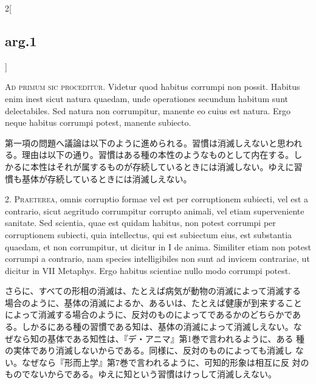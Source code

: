 \documentclass[paper=a4paper,fontsize=10pt,jafontsize=9pt,titlepage]{jlreq}
\begin{document}
\begin{paracol}{2}[\subsection{arg.1}]

{\scshape Ad primum sic proceditur}. Videtur quod habitus corrumpi non
possit. Habitus enim inest sicut natura quaedam, unde operationes
secundum habitum sunt delectabiles. Sed natura non corrumpitur,
manente eo cuius est natura. Ergo neque habitus corrumpi potest,
manente subiecto.

\switchcolumn

第一項の問題へ議論は以下のように進められる。習慣は消滅しえないと思われ
る。理由は以下の通り。習慣はある種の本性のようなものとして内在する。し
かるに本性はそれが属するものが存続しているときには消滅しない。ゆえに習
慣も基体が存続しているときには消滅しえない。


2. {\scshape Praeterea}, omnis corruptio formae vel est per
corruptionem subiecti, vel est a contrario, sicut aegritudo
corrumpitur corrupto animali, vel etiam superveniente sanitate. Sed
scientia, quae est quidam habitus, non potest corrumpi per
corruptionem subiecti, quia intellectus, qui est subiectum eius, est
substantia quaedam, et non corrumpitur, ut dicitur in I de
anima. Similiter etiam non potest corrumpi a contrario, nam species
intelligibiles non sunt ad invicem contrariae, ut dicitur in VII
Metaphys. Ergo habitus scientiae nullo modo corrumpi potest.

\switchcolumn

さらに、すべての形相の消滅は、たとえば病気が動物の消滅によって消滅する
場合のように、基体の消滅によるか、あるいは、たとえば健康が到来すること
によって消滅する場合のように、反対のものによってであるかのどちらかであ
る。しかるにある種の習慣である知は、基体の消滅によって消滅しえない。な
ぜなら知の基体である知性は、『デ・アニマ』第1巻で言われるように、ある
種の実体であり消滅しないからである。同様に、反対のものによっても消滅し
ない。なぜなら『形而上学』第7巻で言われるように、可知的形象は相互に反
対のものでないからである。ゆえに知という習慣はけっして消滅しえない。



\end{paracol}
\end{document}
